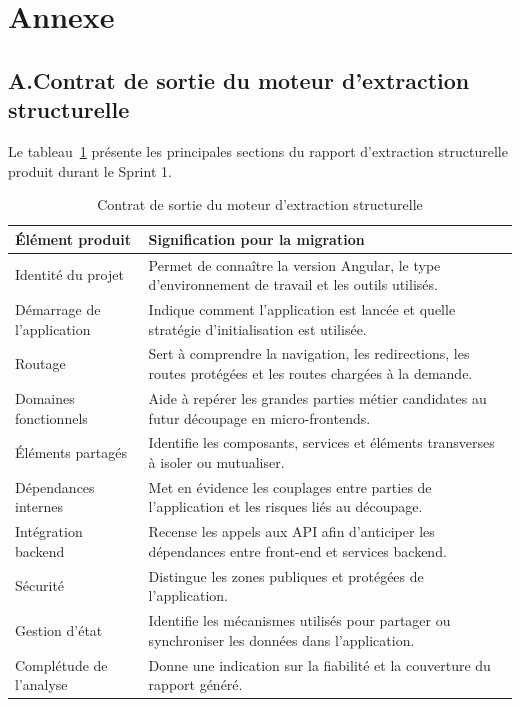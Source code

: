 \clearpage
\chapter*{Annexe}

\renewcommand{\thesection}{A.\arabic{section}}
\setcounter{section}{0}

\newcommand{\annexesection}[2]{%
    \section*{\thesection\quad #1}%
    \label{#2}%
}

\annexesection{Contrat de sortie du moteur d'extraction structurelle}{annexe:contrat-moteur-extraction}

Le tableau~\ref{tab:annexe-rapport-extraction-sprint1} présente les principales sections du rapport d'extraction structurelle produit durant le Sprint 1.

\begingroup
\renewcommand{\arraystretch}{1.12}
\setlength{\tabcolsep}{4pt}
\begin{longtable}{|p{4.2cm}|p{8.8cm}|}
\caption{Contrat de sortie du moteur d'extraction structurelle}\label{tab:annexe-rapport-extraction-sprint1}\\
\hline
\textbf{Élément produit} & \textbf{Signification pour la migration} \\
\hline
Identité du projet & Permet de connaître la version Angular, le type d'environnement de travail et les outils utilisés. \\
\hline
Démarrage de l'application & Indique comment l'application est lancée et quelle stratégie d'initialisation est utilisée. \\
\hline
Routage & Sert à comprendre la navigation, les redirections, les routes protégées et les routes chargées à la demande. \\
\hline
Domaines fonctionnels & Aide à repérer les grandes parties métier candidates au futur découpage en micro-frontends. \\
\hline
Éléments partagés & Identifie les composants, services et éléments transverses à isoler ou mutualiser. \\
\hline
Dépendances internes & Met en évidence les couplages entre parties de l'application et les risques liés au découpage. \\
\hline
Intégration backend & Recense les appels aux API afin d'anticiper les dépendances entre front-end et services backend. \\
\hline
Sécurité & Distingue les zones publiques et protégées de l'application. \\
\hline
Gestion d'état & Identifie les mécanismes utilisés pour partager ou synchroniser les données dans l'application. \\
\hline
Complétude de l'analyse & Donne une indication sur la fiabilité et la couverture du rapport généré. \\
\hline
\end{longtable}
\endgroup

